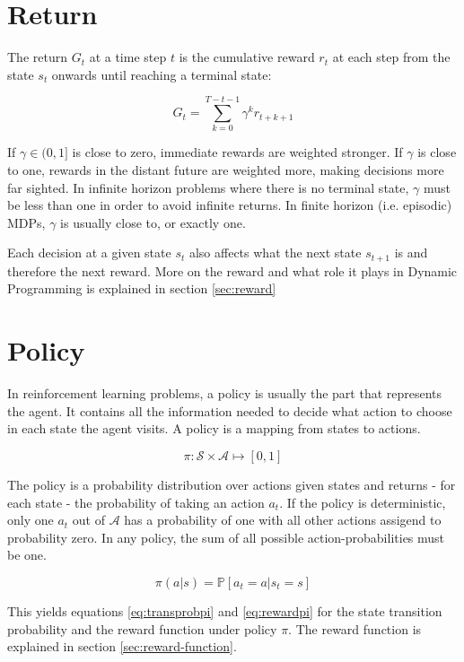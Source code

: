 \section{Return}

The return $G_t$ at a time step $t$ is the cumulative reward $r_t$ at each step from the state $s_t$ onwards until reaching a terminal state:

\begin{equation}
G_t = \sum_{k=0}^{T-t-1}\gamma^k r_{t+k+1}
\end{equation}

If $\gamma \in (0,1]$ is close to zero, immediate rewards are weighted stronger. If $\gamma$ is close to one, rewards in the distant future are weighted more, making decisions more far sighted. In infinite horizon problems where there is no terminal state, $\gamma$ must be less than one in order to avoid infinite returns. In finite horizon (i.e. episodic) MDPs, $\gamma$ is usually close to, or exactly one.

Each decision at a given state $s_t$ also affects what the next state $s_{t+1}$ is and therefore the next reward. More on the reward and what role it plays in Dynamic Programming is explained in section \ref{sec:reward}

\section{Policy}
\label{sec:policy}
In reinforcement learning problems, a policy is usually the part that represents the agent. It contains all the information needed to decide what action to choose in each state the agent visits. A policy is a mapping from states to actions.

\begin{equation}
\pi: \mathcal{S} \times \mathcal{A} \mapsto [0,1]
\end{equation} 

The policy is a probability distribution over actions given states and returns - for each state - the probability of taking an action $a_t$. If the policy is deterministic, only one $a_t$ out of $\mathcal{A}$ has a probability of one with all other actions assigend to probability zero. In any policy, the sum of all possible action-probabilities must be one.

\begin{equation}
\pi(a|s) = \mathbb{P}[a_t=a|s_t=s]
\end{equation}

This yields equations \ref{eq:transprobpi} and \ref{eq:rewardpi} for the state transition probability and the reward function under policy $\pi$. The reward function is explained in section \ref{sec:reward-function}.

